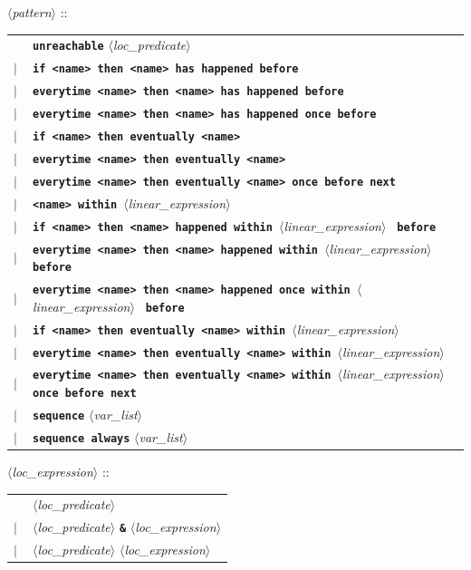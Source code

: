 \documentclass[a4paper,11pt]{article}
\newcommand{\nt}[1]{$\langle$\emph{#1}$\rangle$}
\newcommand{\regleGrammaire}[1]{\bigskip \noindent \nt{#1} :: \\}
\newcommand{\code}[1]{\textbf{\texttt{#1}}}
\begin{document}
\regleGrammaire{pattern}
\begin{tabular}{l l}
	\  & \code{unreachable} \nt{loc\_predicate} \\
	$|$ & \code{if <name> then <name> has happened before} \\
	$|$ & \code{everytime <name> then <name> has happened before} \\
	$|$ & \code{everytime <name> then <name> has happened once before} \\
	$|$ & \code{if <name> then eventually <name>} \\
	$|$ & \code{everytime <name> then eventually <name>} \\
	$|$ & \code{everytime <name> then eventually <name> once before next} \\
	$|$ & \code{<name> within }\nt{linear\_expression} \code{} \\
	$|$ & \code{if <name> then <name> happened within }\nt{linear\_expression} \code{ before} \\
	$|$ & \code{everytime <name> then <name> happened within }\nt{linear\_expression} \code{ before} \\
	$|$ & \code{everytime <name> then <name> happened once within }\nt{linear\_expression} \code{ before} \\
	$|$ & \code{if <name> then eventually <name> within }\nt{linear\_expression} \code{} \\
	$|$ & \code{everytime <name> then eventually <name> within }\nt{linear\_expression} \code{} \\
	$|$ & \code{everytime <name> then eventually <name> within }\nt{linear\_expression} \code{ once before next} \\
	$|$ & \code{sequence} \nt{var\_list} \\
	$|$ & \code{sequence always} \nt{var\_list} \\
\end{tabular}

\regleGrammaire{loc\_expression}
\begin{tabular}{l l}
	\  & \nt{loc\_predicate} \\
	$|$ & \nt{loc\_predicate} \code{\&} \nt{loc\_expression} \\
	$|$ & \nt{loc\_predicate} \nt{loc\_expression} \\
\end{tabular}
\end{document}
